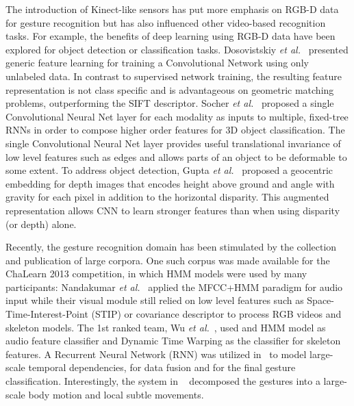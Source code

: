 The introduction of  Kinect-like sensors has put more emphasis on RGB-D data for gesture recognition but has also influenced other video-based recognition tasks.
For example, the benefits of deep learning using RGB-D data have been explored for object detection or classification tasks.
%
Dosovistskiy \emph{et al.}~\cite{DosovitskiySRB14} presented generic feature learning for training a Convolutional Network using only unlabeled data. In contrast to supervised network training, the resulting feature representation is not class specific and is advantageous on geometric matching problems, outperforming the SIFT descriptor.
Socher \emph{et al.}~\cite{socher2012convolutional} proposed a single Convolutional Neural Net layer for each modality as inputs to multiple, fixed-tree RNNs in order to compose higher order features for 3D object classification. The single Convolutional Neural Net layer provides useful translational invariance of low level features such as edges and allows parts of an object to be deformable to some extent.
To address object detection, Gupta \emph{et al.}~\cite{gupta2014learning} proposed a geocentric embedding for depth images that encodes height above ground and angle with gravity for each pixel in addition to the horizontal disparity.
This augmented representation allows CNN to learn stronger features than when using disparity (or depth) alone.

Recently, the gesture recognition domain has been stimulated by the collection and publication of large corpora.
One such corpus was made available for the ChaLearn 2013 competition, in which HMM models were used by many participants:
%
Nandakumar \emph{et al.}~\cite{nandakumar2013multi} applied the MFCC+HMM paradigm for audio input while their visual module still relied on low level features such as Space-Time-Interest-Point (STIP) or covariance descriptor to process RGB videos and skeleton models.
%
The 1st ranked team, Wu \emph{et al.}~\cite{wu2013fusing}, used and HMM model as audio feature classifier and Dynamic Time Warping as the classifier for skeleton features.  A Recurrent Neural Network (RNN) was utilized in~\cite{neverova2013multi} to model large-scale temporal dependencies, for data fusion and for the final gesture classification.  
%
Interestingly, the system in ~\cite{neverova2013multi} decomposed the gestures into a large-scale body motion and local subtle movements.

